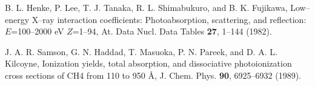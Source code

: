 \documentclass[10pt]{article}
\begin{document}
\begin{thebibliography}{10}
B. L. Henke, P. Lee, T. J. Tanaka, R. L. Shimabukuro, and B. K. Fujikawa,
Low--energy X--ray interaction coefficients: Photoabsorption,
scattering, and reflection: $E$=100--2000 eV $Z$=1--94,
At. Data Nucl. Data Tables {\bf 27}, 1--144 (1982).



J. A. R. Samson, G. N. Haddad, T. Masuoka, P. N. Pareek, 
and D. A. L. Kilcoyne,
Ionization yields, total absorption, and dissociative photoionization 
cross sections of CH4 from 110 to 950 \AA,
J. Chem. Phys. {\bf 90}, 6925--6932 (1989).



\end{thebibliography}
\end{document}
